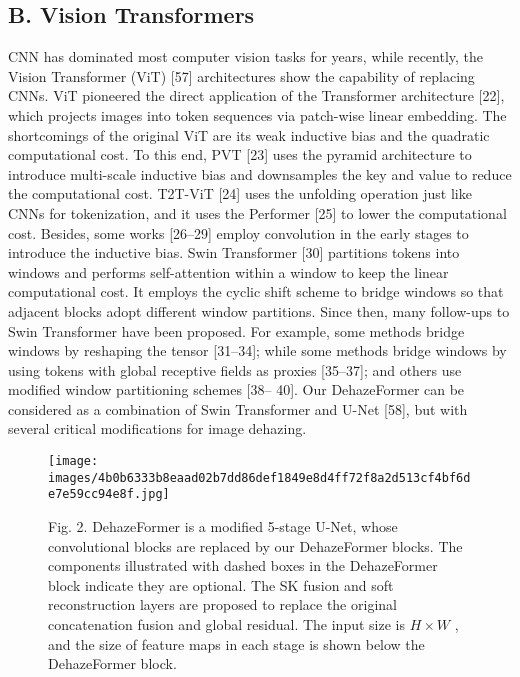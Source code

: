 \documentclass{article}
\begin{document}
\subsection{B. Vision Transformers}


CNN has dominated most computer vision tasks for years, while recently, the Vision Transformer (ViT) [57] architectures show the capability of replacing CNNs. ViT pioneered the direct application of the Transformer architecture [22], which projects images into token sequences via patch-wise linear embedding. The shortcomings of the original ViT are its weak inductive bias and the quadratic computational cost. To this end, PVT [23] uses the pyramid architecture to introduce multi-scale inductive bias and downsamples the key and value to reduce the computational cost. T2T-ViT [24] uses the unfolding operation just like CNNs for tokenization, and it uses the Performer [25] to lower the computational cost. Besides, some works [26–29] employ convolution in the early stages to introduce the inductive bias. Swin Transformer [30] partitions tokens into windows and performs self-attention within a window to keep the linear computational cost. It employs the cyclic shift scheme to bridge windows so that adjacent blocks adopt different window partitions. Since then, many follow-ups to Swin Transformer have been proposed. For example, some methods bridge windows by reshaping the tensor [31–34]; while some methods bridge windows by using tokens with global receptive fields as proxies [35–37]; and others use modified window partitioning schemes [38– 40]. Our DehazeFormer can be considered as a combination of Swin Transformer and U-Net [58], but with several critical modifications for image dehazing.


\begin{figure}[htbp]
\centering
\texttt{[image: images/4b0b6333b8eaad02b7dd86def1849e8d4ff72f8a2d513cf4bf6de7e59cc94e8f.jpg]}
\caption{Fig. 2. DehazeFormer is a modified 5-stage U-Net, whose convolutional blocks are replaced by our DehazeFormer blocks. The components illustrated with dashed boxes in the DehazeFormer block indicate they are optional. The SK fusion and soft reconstruction layers are proposed to replace the original concatenation fusion and global residual. The input size is $H\times W$ , and the size of feature maps in each stage is shown below the DehazeFormer block.}
\end{figure}
\end{document}
